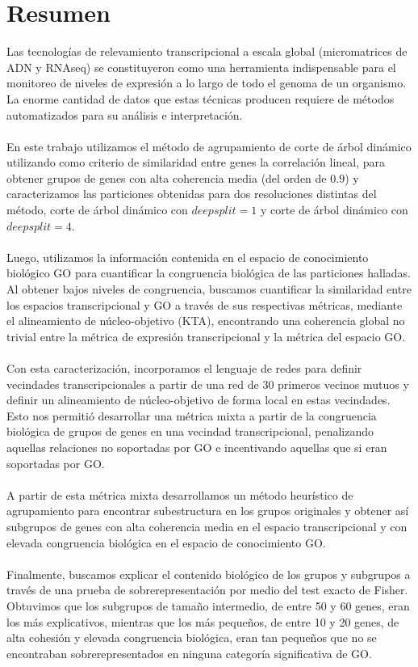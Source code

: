 \chapter*{Resumen}
Las tecnologías de relevamiento transcripcional a escala global (micromatrices de ADN y RNAseq) se constituyeron como  una herramienta indispensable para el monitoreo de niveles de expresión a lo largo de todo el genoma de un organismo. La enorme cantidad de datos que estas técnicas producen requiere de métodos automatizados para su análisis e interpretación.\\\\
En este trabajo utilizamos el método de agrupamiento de corte de árbol dinámico utilizando como criterio de similaridad entre genes la correlación lineal, para obtener grupos de genes con alta coherencia media (del orden de $0.9$) y caracterizamos las particiones obtenidas para dos resoluciones distintas del método, corte de árbol dinámico con $deepsplit=1$ y corte de árbol dinámico con $deepsplit=4$.\\\\
Luego, utilizamos la información contenida en el espacio de conocimiento biológico GO para cuantificar la congruencia biológica de las particiones halladas. Al obtener bajos niveles de congruencia, buscamos cuantificar la similaridad entre los espacios transcripcional y GO a través de sus respectivas métricas, mediante el alineamiento de núcleo-objetivo (KTA), encontrando una coherencia global no trivial entre la métrica de expresión transcripcional y la métrica del espacio GO.\\\\
Con esta caracterización, incorporamos el lenguaje de redes para definir vecindades transcripcionales a partir de una red de 30 primeros vecinos mutuos y definir un alineamiento de núcleo-objetivo de forma local en estas vecindades. Esto nos permitió desarrollar una métrica mixta a partir de la congruencia biológica de grupos de genes en una vecindad transcripcional, penalizando aquellas relaciones no soportadas por GO e incentivando aquellas que si eran soportadas por GO.\\\\
A partir de esta métrica mixta desarrollamos un método heurístico de agrupamiento para encontrar subestructura en los grupos originales y obtener así subgrupos de genes con alta coherencia media en el espacio transcripcional y con elevada congruencia biológica en el espacio de conocimiento GO.\\\\
Finalmente, buscamos explicar el contenido biológico de los grupos y subgrupos a través de una prueba de sobrerepresentación por medio del test exacto de Fisher. Obtuvimos que los subgrupos de tamaño intermedio, de entre 50 y 60 genes, eran los más explicativos, mientras que los más pequeños, de entre 10 y 20 genes, de alta cohesión y elevada congruencia biológica, eran tan pequeños que no se encontraban sobrerepresentados en ninguna categoría significativa de GO. 